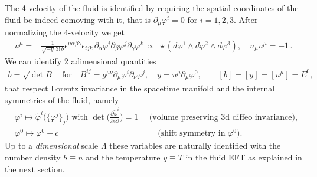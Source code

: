 The 4-velocity of the fluid is identified by requiring the spatial coordinates of the fluid be indeed comoving with it, that is $\partial_\mu \varphi^i=0$ for $i=1,2,3$.
After normalizing the 4-velocity we get
\begin{align}\label{eq:definition_4_velocity}
    u^\mu=& \frac{1}{\sqrt{-g}\, 3!\,b} \epsilon^{\mu \alpha \beta \gamma} \epsilon_{ijk} \, \partial_\alpha \varphi^i \partial_\beta \varphi^j \partial_\gamma \varphi^k\, \propto\,\,  \star(d\varphi^1\wedge d\varphi^2\wedge d \varphi^3), \quad u_\mu u^\mu=-1\,.
\end{align}
We can identify 2 adimensional quantities
\begin{align}\label{eq:definition_b_y}
    b=\sqrt{\det B}\quad \text{for}\quad
    B^{ij}= g^{\mu\nu} \partial_\mu \varphi^i \partial_\nu \varphi^j,\quad y= u^\mu \partial_\mu \varphi^0, \qquad [b]=[y]=[u^\mu]=E^0,
\end{align}
that respect Lorentz invariance in the spacetime manifold and the internal symmetries of the fluid, namely 
{\small\begin{align}\label{eq:symmetries_fluid_internal}
    &\varphi^i \mapsto \tilde{\varphi}^i\big(\{\varphi^j\}_j\big)\,\,\text{with}\,\, \det\Big(\frac{\partial \tilde{\varphi}^i}{\partial\varphi^j}\Big)=1\,\,\quad \text{(volume preserving 3d diffeo invariance)},\\
    &\varphi^0 \mapsto \varphi^0 + c\quad\qquad\quad\qquad\qquad\qquad\qquad \text{(shift symmetry in $\varphi^0$)}.
\end{align}}
Up to a \emph{dimensional} scale $\Lambda$ these variables are naturally identified with the number density $b\equiv n$ and the temperature $y\equiv T$ in the fluid EFT as explained in the next section.

